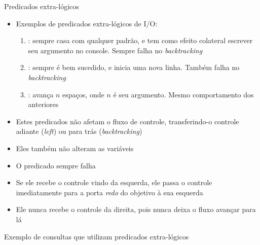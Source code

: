 \begin{frame}[fragile]{Predicados extra-lógicos}

    \begin{itemize}
        \item Exemplos de predicados extra-lógicos de I/O:

        \begin{enumerate}
            \item {}: sempre casa com qualquer padrão, e tem como efeito 
                colateral escrever seu argumento no console. Sempre falha no
                \textit{backtracking}

            \item {}: sempre é bem sucedido, e inicia uma nova linha. Também 
                falha no \textit{backtracking}

            \item {}: avança $n$ espaços, onde $n$ é seu argumento. Mesmo 
                comportamento dos anteriores
        \end{enumerate}

            \item Estes predicados não afetam o fluxo de controle, transferindo-o controle 
                adiante (\textit{left}) ou para trás (\textit{backtracking})

            \item Eles também não alteram as variáveis

            \item O predicado  sempre falha

            \item Se ele recebe o controle vindo da esquerda, ele passa o controle 
                imediatamente para a porta \textit{redo} do objetivo à sua esquerda

            \item Ele nunca recebe o controle da direita, pois nunca deixa o fluxo avançar 
                para lá
    \end{itemize}

\end{frame}

\begin{frame}[fragile]{Exemplo de consultas que utilizam predicados extra-lógicos}


\end{frame}
